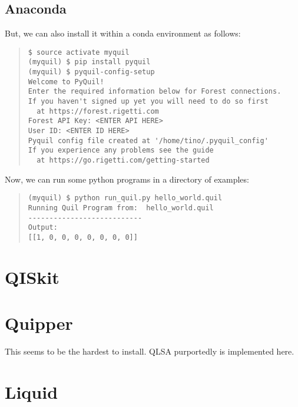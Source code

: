 \documentclass[12pt]{book}
\begin{document}
\section{Anaconda}

But, we can also install it within a conda environment as follows:
\begin{quote}
\begin{verbatim} 
$ source activate myquil
(myquil) $ pip install pyquil
(myquil) $ pyquil-config-setup
Welcome to PyQuil!
Enter the required information below for Forest connections.
If you haven't signed up yet you will need to do so first 
  at https://forest.rigetti.com
Forest API Key: <ENTER API HERE>
User ID: <ENTER ID HERE>
Pyquil config file created at '/home/tino/.pyquil_config'
If you experience any problems see the guide 
  at https://go.rigetti.com/getting-started
\end{verbatim}
\end{quote}
Now, we can run some python programs in a directory of examples:
\begin{quote}
\begin{verbatim} 
(myquil) $ python run_quil.py hello_world.quil 
Running Quil Program from:  hello_world.quil
---------------------------
Output: 
[[1, 0, 0, 0, 0, 0, 0, 0]]
\end{verbatim}
\end{quote}



\chapter{QISkit}



\chapter{Quipper}

This seems to be the hardest to install.
QLSA purportedly is implemented here.



\chapter{Liquid}
\end{document}

